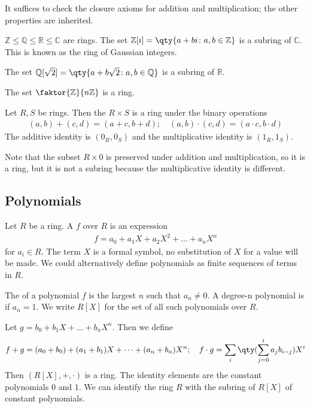 \begin{remark}
	It suffices to check the closure axioms for addition and multiplication; the other properties are inherited.
\end{remark}

\begin{example}
	$\mathbb Z \leq \mathbb Q \leq \mathbb R \leq \mathbb C$ are rings.
	The set $\mathbb Z[i] = \qty{a+bi \colon a,b\in\mathbb Z}$ is a subring of $\mathbb C$.
	This is known as the ring of Gaussian integers.
\end{example}

\begin{example}
	The set $\mathbb Q[\sqrt{2}] = \qty{a+b\sqrt{2} \colon a,b \in\mathbb Q}$ is a subring of $\mathbb R$.
\end{example} 

\begin{example}
	The set $\faktor{\mathbb Z}{n\mathbb Z}$ is a ring.
\end{example}

\begin{example}
	Let $R, S$ be rings.
	Then the  $R \times S$ is a ring under the binary operations
	\begin{align*}
		(a,b) + (c,d) = (a+c,b+d);\quad (a,b) \cdot (c,d) = (a\cdot c,b\cdot d)
	\end{align*}
	The additive identity is $(0_R, 0_S)$ and the multiplicative identity is $(1_R, 1_S)$.

	Note that the subset $R \times \qty{0}$ is preserved under addition and multiplication, so it is a ring, but it is not a subring because the multiplicative identity is different.
\end{example}

\subsection{Polynomials}
\begin{definition}[Polynomial]
	Let $R$ be a ring.
	A  $f$ over $R$ is an expression
	\begin{align*}
		f = a_0 + a_1 X + a_2 X^2 + \dots + a_n X^n
	\end{align*}
	for $a_i \in R$.
	The term $X$ is a formal symbol, no substitution of $X$ for a value will be made.
	We could alternatively define polynomials as finite sequences of terms in $R$.

	The  of a polynomial $f$ is the largest $n$ such that $a_n \neq 0$.
	A degree-n polynomial is  if $a_n = 1$.
	We write $R[X]$ for the set of all such polynomials over $R$.

	Let $g = b_0 + b_1 X + \dots + b_n X^n$.
	Then we define
	\begin{align*}
		f + g = (a_0 + b_0) + (a_1 + b_1) X + \dots + (a_n + b_n) X^n;\quad f \cdot g = \sum_i \qty(\sum_{j=0}^i a_j b_{i-j}) X^i
	\end{align*}
	Then $(R[X], +, \cdot)$ is a ring.
	The identity elements are the constant polynomials $0$ and $1$.
	We can identify the ring $R$ with the subring of $R[X]$ of constant polynomials.
\end{definition}

